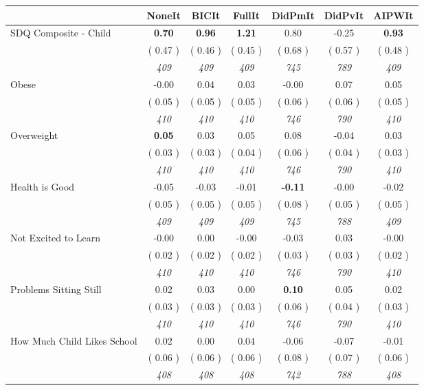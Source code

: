 \begin{tabular}{l c c c c c c}
\toprule
 & NoneIt & BICIt & FullIt & DidPmIt & DidPvIt & AIPWIt \\
\midrule
SDQ Composite - Child & \textbf{      0.70 } & \textbf{      0.96 } & \textbf{      1.21 } &      0.80 &     -0.25 & \textbf{     0.93} \\
& (     0.47 ) & (     0.46 ) & (     0.45 ) & (     0.68 ) & (     0.57 ) & (     0.48 ) \\
& \textit{ 409 } & \textit{ 409 } & \textit{ 409 } & \textit{ 745 } & \textit{ 789 } & \textit{ 409 } \\
Obese &     -0.00 &      0.04 &      0.03 &     -0.00 &      0.07 &      0.05 \\
& (     0.05 ) & (     0.05 ) & (     0.05 ) & (     0.06 ) & (     0.06 ) & (     0.05 ) \\
& \textit{ 410 } & \textit{ 410 } & \textit{ 410 } & \textit{ 746 } & \textit{ 790 } & \textit{ 410 } \\
Overweight & \textbf{      0.05 } &      0.03 &      0.05 &      0.08 &     -0.04 &      0.03 \\
& (     0.03 ) & (     0.03 ) & (     0.04 ) & (     0.06 ) & (     0.04 ) & (     0.03 ) \\
& \textit{ 410 } & \textit{ 410 } & \textit{ 410 } & \textit{ 746 } & \textit{ 790 } & \textit{ 410 } \\
Health is Good &     -0.05 &     -0.03 &     -0.01 & \textbf{     -0.11 } &     -0.00 &     -0.02 \\
& (     0.05 ) & (     0.05 ) & (     0.05 ) & (     0.08 ) & (     0.05 ) & (     0.05 ) \\
& \textit{ 409 } & \textit{ 409 } & \textit{ 409 } & \textit{ 745 } & \textit{ 788 } & \textit{ 409 } \\
Not Excited to Learn &     -0.00 &      0.00 &     -0.00 &     -0.03 &      0.03 &     -0.00 \\
& (     0.02 ) & (     0.02 ) & (     0.02 ) & (     0.03 ) & (     0.03 ) & (     0.02 ) \\
& \textit{ 410 } & \textit{ 410 } & \textit{ 410 } & \textit{ 746 } & \textit{ 790 } & \textit{ 410 } \\
Problems Sitting Still &      0.02 &      0.03 &      0.00 & \textbf{      0.10 } &      0.05 &      0.02 \\
& (     0.03 ) & (     0.03 ) & (     0.03 ) & (     0.06 ) & (     0.04 ) & (     0.03 ) \\
& \textit{ 410 } & \textit{ 410 } & \textit{ 410 } & \textit{ 746 } & \textit{ 790 } & \textit{ 410 } \\
How Much Child Likes School &      0.02 &      0.00 &      0.04 &     -0.06 &     -0.07 &     -0.01 \\
& (     0.06 ) & (     0.06 ) & (     0.06 ) & (     0.08 ) & (     0.07 ) & (     0.06 ) \\
& \textit{ 408 } & \textit{ 408 } & \textit{ 408 } & \textit{ 742 } & \textit{ 788 } & \textit{ 408 } \\
\bottomrule
\end{tabular}
